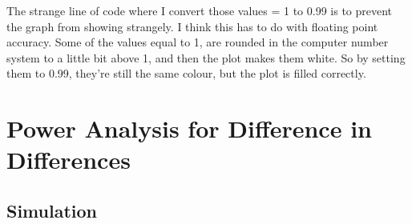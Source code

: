 \documentclass[
]{article}
\begin{document}
The strange line of code where I convert those values = 1 to 0.99 is to
prevent the graph from showing strangely. I think this has to do with
floating point accuracy. Some of the values equal to 1, are rounded in
the computer number system to a little bit above 1, and then the plot
makes them white. So by setting them to 0.99, they're still the same
colour, but the plot is filled correctly.

\hypertarget{power-analysis-for-difference-in-differences}{%
\section{Power Analysis for Difference in
Differences}\label{power-analysis-for-difference-in-differences}}

\hypertarget{simulation-1}{%
\subsection{Simulation}\label{simulation-1}}
\end{document}

